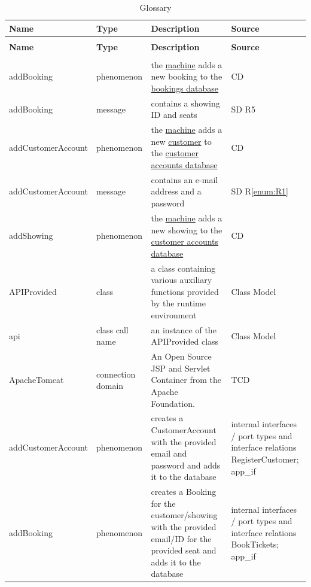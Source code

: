 \documentclass[a4paper,10pt,titlepage,bibtotoc,bibtotocnumbered]{scrreprt}
\begin{document}
\begin{longtable}{|p{.4\linewidth}|p{.2\linewidth}|p{.2\linewidth}|p{.2\linewidth}|}
\caption{Glossary}
\label{table:glossar}\\
\hline
\rowcolor{black!25}\textbf{Name} & \textbf{Type} & \textbf{Description} & \textbf{Source}\\
\hline
\endfirsthead
\caption[]{Glossary}\\
\hline
\rowcolor{black!25}\textbf{Name} & \textbf{Type} & \textbf{Description} & \textbf{Source}\\
\endhead
\hline
\endfoot
\multicolumn{4}{|l|}{\textbf{A}}\\
\hline
\hypertarget{glossary:addBooking}{addBooking} & phenomenon & the \hyperlink{glossary:UDEKino}{machine} adds a new booking to the \hyperlink{glossary:Booking}{bookings database} & CD\\
\hline
addBooking & message & contains a showing ID and seats & SD R5\\
\hline
\hypertarget{glossary:addCustomerAccount}{addCustomerAccount} & phenomenon & the \hyperlink{glossary:UDEKino}{machine} adds a new \hyperlink{glossary:Customer}{customer} to the \hyperlink{glossary:CustomerAccount}{customer accounts database} & CD\\
\hline
addCustomerAccount & message & contains an e-mail address and a password & SD R\ref{enum:R1}\\
\hline
\hypertarget{glossary:addShowing}{addShowing} & phenomenon & the \hyperlink{glossary:UDEKino}{machine} adds a new showing to the \hyperlink{glossary:ShowingsDatabase}{customer accounts database} & CD\\
\hline
APIProvided & class & a class containing various auxiliary functions provided by the runtime environment & Class Model\\
\hline
api & class call name & an instance of the APIProvided class & Class Model\\
\hline
ApacheTomcat & connection domain & An Open Source JSP and Servlet Container from the Apache Foundation. & TCD\\
\hline
addCustomerAccount & phenomenon & creates a CustomerAccount with the provided email and password and adds it to the database & internal interfaces / port types and interface relations RegisterCustomer; app\_if\\
\hline
addBooking & phenomenon & creates a Booking for the customer/showing with the provided email/ID for the provided seat and adds it to the database & internal interfaces / port types and interface relations BookTickets; app\_if\\

\end{longtable}
\end{document}
